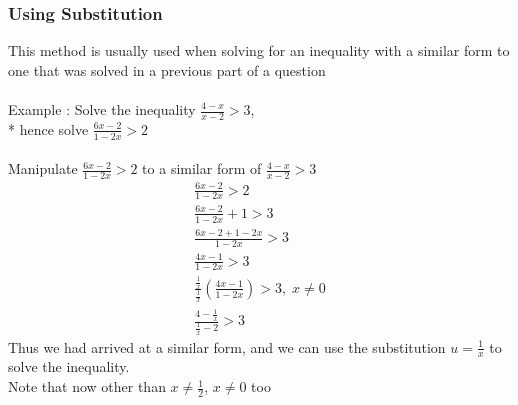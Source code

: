 \documentclass[../main.tex]{subfiles}
\begin{document}
\subsubsection{Using Substitution}
This method is usually used when solving for an inequality with
a similar form to one that was solved in a previous part of a question \\\\
Example : Solve the inequality \(\displaystyle \frac{4-x}{x-2}>3\), \\* hence solve \(\displaystyle \frac{6x-2}{1-2x}>2\) \\\\
Manipulate \(\displaystyle \frac{6x-2}{1-2x}>2\) to a similar form of \(\displaystyle \frac{4-x}{x-2}>3\)
\begin{align*}
    \displaystyle \frac{6x-2}{1-2x}>2 \\
    \displaystyle \frac{6x-2}{1-2x}+1>3 \\
    \displaystyle \frac{6x-2+1-2x}{1-2x}>3 \\
    \displaystyle \frac{4x-1}{1-2x}>3 \\
    \displaystyle \frac{\frac{1}{x}}{\frac{1}{x}}\left(\frac{4x-1}{1-2x}\right)>3, \; x \neq 0 \\
    \displaystyle \frac{4-\frac{1}{x}}{\frac{1}{x}-2}>3
\end{align*}
Thus we had arrived at a similar form, and we can use
the substitution \(u=\frac{1}{x}\) to solve the inequality. \\
Note that now other than \(\displaystyle x \neq \frac{1}{2}\), \(x \neq 0\) too
\end{document}
